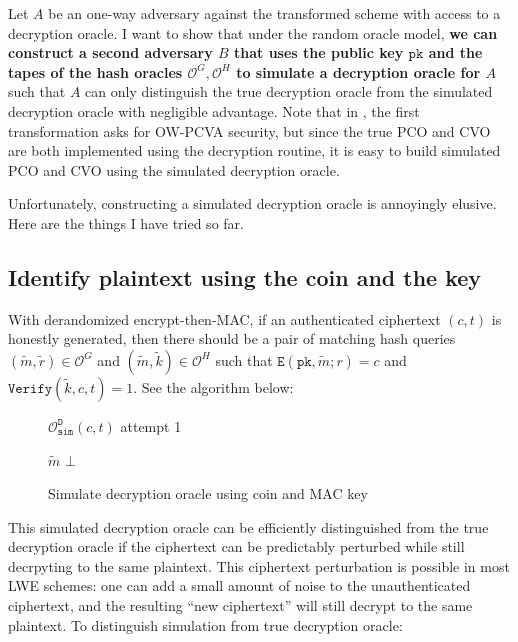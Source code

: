 \documentclass{article}
\newcommand{\monospace}{\texttt}
\newcommand{\encrypt}{\monospace{E}}
\newcommand{\decrypt}{\monospace{D}}
\newcommand{\verify}{\monospace{Verify}}
\newcommand{\pk}{\monospace{pk}}
\newcommand{\oracle}[1]{\mathcal{O}^{#1}}
\begin{document}
Let $A$ be an one-way adversary against the transformed scheme with access to a decryption oracle. I want to show that under the random oracle model, \textbf{we can construct a second adversary $B$ that uses the public key $\pk$ and the tapes of the hash oracles $\oracle{G}, \oracle{H}$ to simulate a decryption oracle for $A$} such that $A$ can only distinguish the true decryption oracle from the simulated decryption oracle with negligible advantage. Note that in \cite{hofheinz2017modular}, the first transformation asks for OW-PCVA security, but since the true PCO and CVO are both implemented using the decryption routine, it is easy to build simulated PCO and CVO using the simulated decryption oracle.

Unfortunately, constructing a simulated decryption oracle is annoyingly elusive. Here are the things I have tried so far.

\subsection{Identify plaintext using the coin and the key}
With derandomized encrypt-then-MAC, if an authenticated  ciphertext $(c, t)$ is honestly generated, then there should be a pair of matching hash queries $(\tilde{m}, \tilde{r}) \in \oracle{G}$ and $(\tilde{m}, \tilde{k}) \in \oracle{H}$ such that $\encrypt(\pk, \tilde{m}; r) = c$ and $\verify(\tilde{k}, c, t) = 1$. See the algorithm below:

\begin{figure}[H]
    \center
    \begin{algorithm}[H]
        \caption{$\oracle{\decrypt}_\monospace{sim}(c, t)$ attempt 1}
        \begin{algorithmic}[1]
            \If{
                $\exists (\tilde{m}, \tilde{r}) \in \oracle{G}
                    , (\tilde{m}, \tilde{k}) \in \oracle{H} :
                    \encrypt(\pk, \tilde{m}; \tilde{r}) = c
                    \land \verify(\tilde{k}, c, t) = 1
                $
            }
                \State \Return $\tilde{m}$
            \EndIf
            \State \Return $\bot$
        \end{algorithmic}
    \end{algorithm}
    \caption{Simulate decryption oracle using coin and MAC key}
    \label{fig:sim-decrypt-}
\end{figure}

This simulated decryption oracle can be efficiently distinguished from the true decryption oracle if the ciphertext can be predictably perturbed while still decrpyting to the same plaintext. This ciphertext perturbation is possible in most LWE schemes: one can add a small amount of noise to the unauthenticated ciphertext, and the resulting ``new ciphertext'' will still decrypt to the same plaintext. To distinguish simulation from true decryption oracle:
\end{document}
